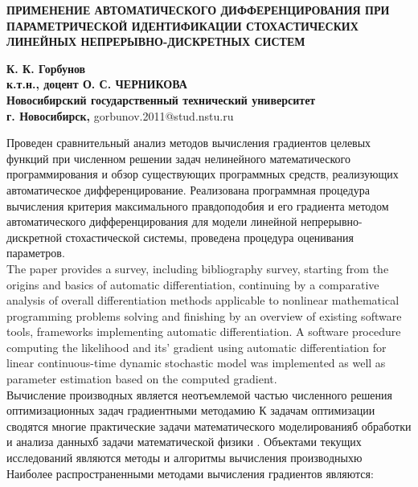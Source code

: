 \documentclass[10pt,a5paper]{article}
\begin{document}
\begin{center}
\MakeUppercase{\textbf{Применение автоматического дифференцирования при
параметрической идентификации стохастических линейных непрерывно-дискретных
систем}} \\
\end{center}

\begin{center} \textbf{
К. К. Горбунов \\
к.т.н., доцент О. С. ЧЕРНИКОВА \\
Новосибирский государственный технический университет \\
г. Новосибирск,} gorbunov.2011@stud.nstu.ru
\end{center}

{\small \noindent Проведен сравнительный анализ методов вычисления градиентов
	целевых функций при численном решении задач нелинейного математического
		программирования и обзор существующих программных средств, реализующих
		автоматическое дифференцирование. Реализована программная процедура
		вычисления критерия максимального правдоподобия и его градиента методом
		автоматического дифференцирования для модели линейной
		непрерывно-дискретной стохастической системы, проведена процедура
		оценивания параметров. \\ The paper provides a survey, including
		bibliography survey, starting from the origins and basics of automatic
		differentiation, continuing by a comparative analysis of overall
		differentiation methods applicable to nonlinear mathematical
		programming problems solving and finishing by an overview of existing
		software tools, frameworks implementing automatic differentiation. A
		software procedure computing the likelihood and its’ gradient using
		automatic differentiation for linear continuous-time dynamic stochastic
		model was implemented as well as parameter estimation based on the
		computed gradient. } \\

Вычисление производных является неотъемлемой частью численного решения
оптимизационных задач градиентными методамию К задачам оптимизации сводятся
многие практические задачи математического моделированияб обработки и анализа
данныхб задачи математической физики \cite{}. Объектами текущих исследований
являются методы и алгоритмы вычисления производныхю Наиболее распространенными
методами вычисления градиентов являются:
\end{document}
